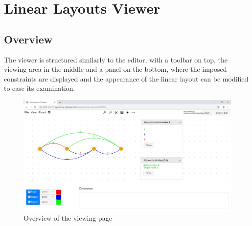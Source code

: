 {\section{Linear Layouts Viewer}
\subsection{Overview}
The viewer is structured similarly to the editor, with a toolbar on top, the viewing area in the middle and a panel on the bottom, where the imposed constraints are displayed and the appearance of the linear layout can be modified to ease its examination.
\begin{figure}[!h]
\begin{center}
\includegraphics[width=1\textwidth]{figures/figSecond/OverviewSecond.jpg}
\caption{Overview of the viewing page}
\label{img:plzhltr}
\end{center}
\end{figure}
}
